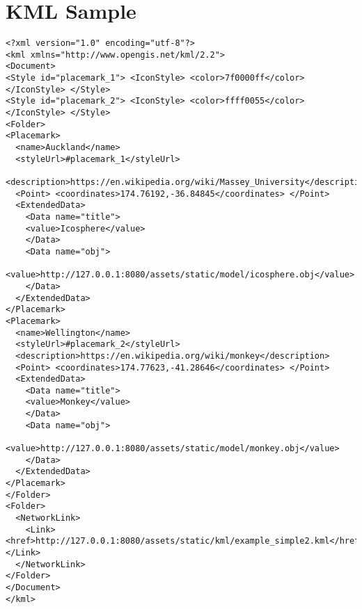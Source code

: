 \chapter{KML Sample}
\label{appendix-kml-sample}

\begin{lstlisting}
<?xml version="1.0" encoding="utf-8"?>
<kml xmlns="http://www.opengis.net/kml/2.2">
<Document>
<Style id="placemark_1"> <IconStyle> <color>7f0000ff</color> </IconStyle> </Style>
<Style id="placemark_2"> <IconStyle> <color>ffff0055</color> </IconStyle> </Style>
<Folder>
<Placemark>
  <name>Auckland</name>
  <styleUrl>#placemark_1</styleUrl>
  <description>https://en.wikipedia.org/wiki/Massey_University</description>
  <Point> <coordinates>174.76192,-36.84845</coordinates> </Point>
  <ExtendedData>
    <Data name="title">
    <value>Icosphere</value>
    </Data>
    <Data name="obj">
    <value>http://127.0.0.1:8080/assets/static/model/icosphere.obj</value>
    </Data>
  </ExtendedData>
</Placemark>
<Placemark>
  <name>Wellington</name>
  <styleUrl>#placemark_2</styleUrl>
  <description>https://en.wikipedia.org/wiki/monkey</description>
  <Point> <coordinates>174.77623,-41.28646</coordinates> </Point>
  <ExtendedData>
    <Data name="title">
    <value>Monkey</value>
    </Data>
    <Data name="obj">
    <value>http://127.0.0.1:8080/assets/static/model/monkey.obj</value>
    </Data>
  </ExtendedData>
</Placemark>
</Folder>
<Folder>
  <NetworkLink>
    <Link> <href>http://127.0.0.1:8080/assets/static/kml/example_simple2.kml</href> </Link>
  </NetworkLink>
</Folder>
</Document>
</kml>
\end{lstlisting}

